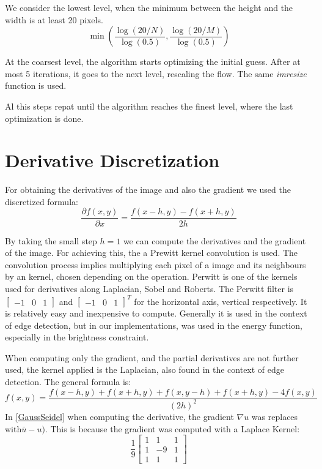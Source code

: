 \documentclass[12pt,a4paper,twoside]{report}
\begin{document}
{We consider the lowest level, when the minimum between the height and the width is at least  20 pixels.  
$$
\min\left(\frac{\log(20/N)}{\log(0.5)},
\frac{\log(20/M)}{\log(0.5)}\right)
$$

At the coarsest level, the algorithm starts optimizing the initial guess. After at most 5 iterations, it goes to the next level, rescaling the flow. The same \textit{imresize} function is used. 

Al this steps repat until the algorithm reaches the finest level, where the last optimization is done.  

\section{Derivative Discretization}

 For obtaining the derivatives of the image and also the gradient we used the discretized formula:
\begin{equation}
		\frac{\partial f(x, y)}{\partial x} =  \frac{f(x-h, y) - f(x+h,y)}{2h}
\end{equation}

By taking the small step $h = 1$ we can compute the derivatives and the gradient of the image.
For achieving this, the a Prewitt kernel convolution is used. The convolution process implies multiplying each pixel of a image and its neighbours by an kernel, chosen depending on the operation. Perwitt is one of the kernels used for derivatives along  Laplacian, Sobel and Roberts. The Perwitt filter is $\begin{bmatrix}-1 & 0 & 1\end{bmatrix}$ and  
$\begin{bmatrix}-1 & 0 & 1\end{bmatrix}^T$  for the horizontal axis, vertical respectively. It is relatively easy and inexpensive to compute. Generally it is used in the context of edge detection, but in our implementations, was used in the energy function, especially in the brightness constraint. 

When computing only the gradient, and the partial derivatives are not further used, the kernel applied is the Laplacian, also found in the context of edge detection. The general formula is:
\begin{equation}
f(x, y) =  \frac{f(x-h, y) + f(x+h,y) +f(x,y-h) +f(x+h,y) - 4f(x,y)}
{(2h)^2}
\end{equation}
 In \ref{GaussSeidel} when computing the derivative, the gradient $\nabla u$ was replaces with$\bar{u} - u)$. This is because the gradient was computed with a Laplace Kernel:
 \begin{equation}
 \frac{1}{9}
 \begin{bmatrix}
 	1 & 1 & 1 \\
 	1 & -9 & 1 \\
 	1 & 1 & 1
 \end{bmatrix}
 \end{equation}


}
\end{document}
